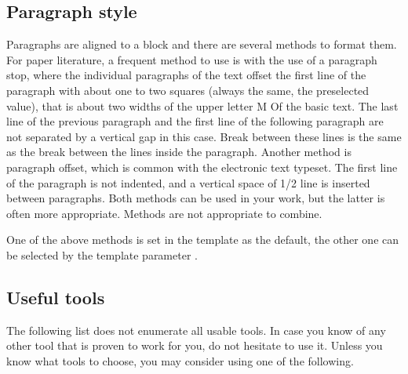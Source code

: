 \subsection*{Paragraph style}

Paragraphs are aligned to a block and there are several methods to format them. For paper literature, a frequent method to use is with the use of a paragraph stop, where the individual paragraphs of the text offset the first line of the paragraph with about one to two squares (always the same, the preselected value), that is about two widths of the upper letter M Of the basic text. The last line of the previous paragraph and the first line of the following paragraph are not separated by a vertical gap in this case. Break between these lines is the same as the break between the lines inside the paragraph. \cite{fitWeb} Another method is paragraph offset, which is common with the electronic text typeset. The first line of the paragraph is not indented, and a vertical space of 1/2 line is inserted between paragraphs. Both methods can be used in your work, but the latter is often more appropriate. Methods are not appropriate to combine.

One of the above methods is set in the template as the default, the other one can be selected by the template parameter .

\subsection*{Useful tools}
\label{tools}

The following list does not enumerate all usable tools. In case you know of any other tool that is proven to work for you, do not hesitate to use it. Unless you know what tools to choose, you may consider using one of the following.

